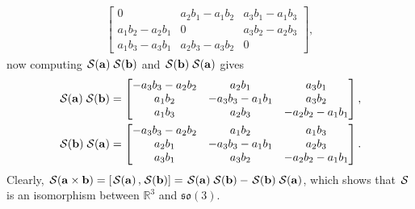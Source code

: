 \begin{example}
\begin{align*}
\begin{bmatrix}
            0 & a_2b_1-a_1b_2 & a_3b_1-a_1b_3\\
            a_1b_2 - a_2b_1 & 0 & a_3b_2-a_2b_3\\
            a_1b_3-a_3b_1 & a_2b_3-a_3b_2 & 0
        \end{bmatrix},
    \end{align*}
    now computing $\SL[\mathbf{a}]\SL[\mathbf{b}]$ and $\SL[\mathbf{b}]\SL[\mathbf{a}]$ gives
    \begin{align*}
        \SL[\mathbf{a}]\SL[\mathbf{b}] &=
        \begin{bmatrix}
            -a_3b_3 -a_2b_2 & a_2b_1 & a_3b_1\\
            a_1b_2 & -a_3b_3 - a_1b_1 & a_3b_2\\
            a_1b_3 & a_2b_3 & -a_2b_2 - a_1b_1
        \end{bmatrix},\\
        \SL[\mathbf{b}]\SL[\mathbf{a}] &=
        \begin{bmatrix}
            -a_3b_3 -a_2b_2 & a_1b_2 & a_1b_3\\
            a_2b_1 & -a_3b_3 - a_1b_1 & a_2b_3\\
            a_3b_1 & a_3b_2 & -a_2b_2 - a_1b_1
        \end{bmatrix}.
    \end{align*}
    Clearly, $\SL[\mathbf{a}\times \mathbf{b}] = [\SL[\mathbf{a}], \SL[\mathbf{b}]] = \SL[\mathbf{a}]\SL[\mathbf{b}] - \SL[\mathbf{b}]\SL[\mathbf{a}]$, which shows that $\SL$ is an isomorphism between $\mathbb{R}^3$ and $\mathfrak{so}(3)$.
\end{example}
